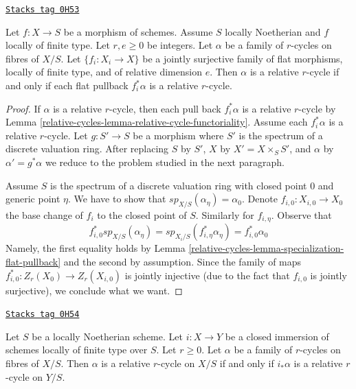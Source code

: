 \begin{lemma}
\label{relative-cycles-lemma-families-specialization-fppf-descent}
\href{https://stacks.math.columbia.edu/tag/0H53}{\texttt{Stacks tag 0H53}}

Let $f : X \to S$ be a morphism of schemes. Assume $S$ locally Noetherian
and $f$ locally of finite type. Let $r, e \geq 0$ be integers.
Let $\alpha$ be a family of $r$-cycles on fibres of $X/S$.
Let $\{f_i : X_i \to X\}$ be a jointly surjective family
of flat morphisms, locally of finite type, and of relative dimension $e$.
Then $\alpha$ is a relative $r$-cycle if and only if each flat
pullback $f_i^*\alpha$ is a relative $r$-cycle.
\end{lemma}

\begin{proof}
If $\alpha$ is a relative $r$-cycle, then each pull back $f_i^*\alpha$ is a
relative $r$-cycle by Lemma \ref{relative-cycles-lemma-relative-cycle-functoriality}.
Assume each $f_i^*\alpha$ is a relative $r$-cycle.
Let $g : S' \to S$ be a morphism where $S'$ is the spectrum of a discrete
valuation ring. After replacing $S$ by $S'$, $X$ by $X' = X \times_S S'$, and
$\alpha$ by $\alpha' = g^*\alpha$
we reduce to the problem studied in the next paragraph.

\medskip\noindent
Assume $S$ is the spectrum of a discrete valuation ring with closed
point $0$ and generic point $\eta$. We have to show that
$sp_{X/S}(\alpha_\eta) = \alpha_0$. Denote $f_{i, 0} : X_{i, 0} \to X_0$
the base change of $f_i$ to the closed point of $S$. Similarly
for $f_{i, \eta}$.
Observe that
$$
f_{i, 0}^*sp_{X/S}(\alpha_\eta) =
sp_{X_i/S}(f_{i, \eta}^*\alpha_\eta) = f_{i, 0}^*\alpha_0
$$
Namely, the first equality holds by
Lemma \ref{relative-cycles-lemma-specialization-flat-pullback}
and the second by assumption. Since the family of maps
$f_{i, 0}^* : Z_r(X_0) \to Z_r(X_{i, 0})$ is jointly
injective (due to the fact that $f_{i, 0}$ is jointly
surjective), we conclude what we want.
\end{proof}

\begin{lemma}
\label{relative-cycles-lemma-check-after-closed}
\href{https://stacks.math.columbia.edu/tag/0H54}{\texttt{Stacks tag 0H54}}

Let $S$ be a locally Noetherian scheme. Let $i : X \to Y$ be a closed immersion
of schemes locally of finite type over $S$. Let $r \geq 0$.
Let $\alpha$ be a family of $r$-cycles on fibres of $X/S$.
Then $\alpha$ is a relative $r$-cycle on $X/S$ if and only if
$i_*\alpha$ is a relative $r$-cycle on $Y/S$.
\end{lemma}

